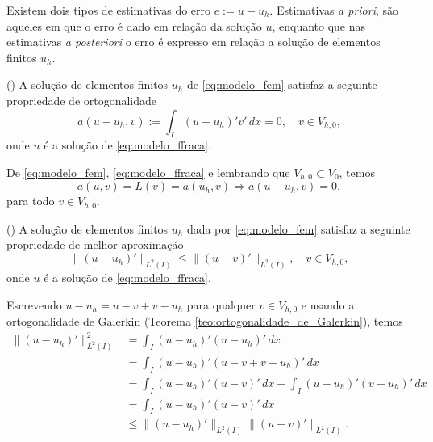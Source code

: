 Existem dois tipos de estimativas do erro $e := u - u_h$. Estimativas {\it a priori}, são aqueles em que o erro é dado em relação da solução $u$, enquanto que nas estimativas {\it a posteriori} o erro é expresso em relação a solução de elementos finitos $u_h$.

\begin{teo}()\label{teo:ortogonalidade_de_Galerkin}
  A solução de elementos finitos $u_h$ de \eqref{eq:modelo_fem} satisfaz a seguinte propriedade de ortogonalidade
  \begin{equation}
    a(u-u_h,v) := \int_I (u-u_h)'v'\,dx = 0,\quad v\in V_{h,0},
  \end{equation}
onde $u$ é a solução de \eqref{eq:modelo_ffraca}.
\end{teo}
\begin{dem}
  De \eqref{eq:modelo_fem}, \eqref{eq:modelo_ffraca} e lembrando que $V_{h,0}\subset V_0$, temos
  \begin{equation}
    a(u,v) = L(v) = a(u_h,v) \Rightarrow a(u-u_h, v) = 0,
  \end{equation}
para todo $v\in V_{h,0}$.
\end{dem}

\begin{teo}()\label{teo:fem1d_melhor_aprox}
  A solução de elementos finitos $u_h$ dada por \eqref{eq:modelo_fem} satisfaz a seguinte propriedade de melhor aproximação
  \begin{equation}
    \|(u-u_h)'\|_{L^2(I)} \leq \|(u-v)'\|_{L^2(I)},\quad v\in V_{h,0},\label{eq:modelo_melhor_aprox}
  \end{equation}
onde $u$ é a solução de \eqref{eq:modelo_ffraca}.
\end{teo}
\begin{dem}
  Escrevendo $u-u_h = u-v+v-u_h$ para qualquer $v\in V_{h,0}$ e usando a ortogonalidade de Galerkin (Teorema \ref{teo:ortogonalidade_de_Galerkin}), temos
  \begin{align}
    \|(u-u_h)'\|_{L^2(I)}^2 &= \int_{I} (u-u_h)'(u-u_h)'\,dx\\
    &= \int_I (u-u_h)'(u-v+v-u_h)'\,dx\\
    &= \int_I (u-u_h)'(u-v)'\,dx + \int_I (u-u_h)'(v-u_h)'\,dx\\
    &= \int_I (u-u_h)'(u-v)'\,dx\\
    &\leq \|(u-u_h)'\|_{L^2(I)}\|(u-v)'\|_{L^2(I)}.
  \end{align}
\end{dem}

